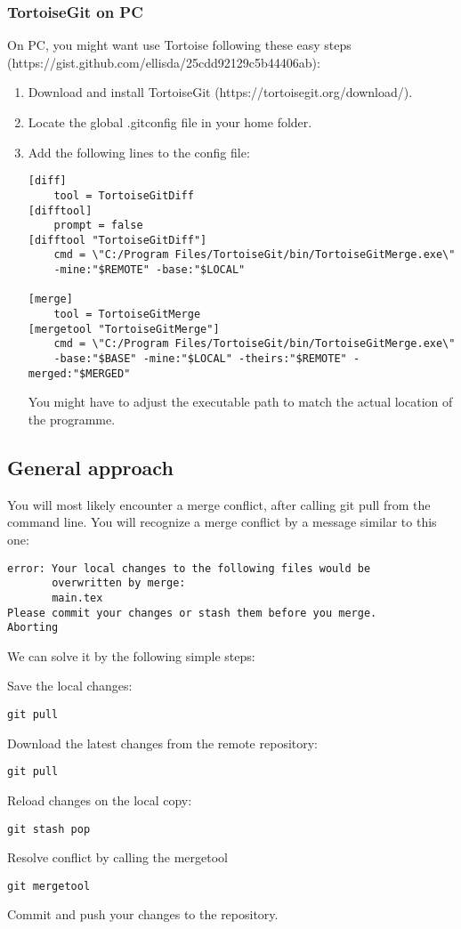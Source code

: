 \documentclass{article}
\begin{document}
\subsubsection{TortoiseGit on PC}
On PC, you might want use Tortoise following these easy steps (https://gist.github.com/ellisda/25cdd92129c5b44406ab):
\begin{enumerate}
    \item Download and install TortoiseGit (https://tortoisegit.org/download/).
    \item Locate the global .gitconfig file in your home folder.
    \item Add the following lines to the config file:
    \begin{verbatim}
[diff]
    tool = TortoiseGitDiff	
[difftool]
    prompt = false
[difftool "TortoiseGitDiff"]
    cmd = \"C:/Program Files/TortoiseGit/bin/TortoiseGitMerge.exe\"
    -mine:"$REMOTE" -base:"$LOCAL" 

[merge]
    tool = TortoiseGitMerge	
[mergetool "TortoiseGitMerge"]
    cmd = \"C:/Program Files/TortoiseGit/bin/TortoiseGitMerge.exe\"
    -base:"$BASE" -mine:"$LOCAL" -theirs:"$REMOTE" -merged:"$MERGED"
    \end{verbatim}
    You might have to adjust the executable path to match the actual location of the programme.
\end{enumerate}

\subsection{General approach}
You will most likely encounter a merge conflict, after calling git pull from the command line. You will recognize a merge conflict by a message similar to this one:
\begin{verbatim}
error: Your local changes to the following files would be 
       overwritten by merge:
       main.tex
Please commit your changes or stash them before you merge. 
Aborting
\end{verbatim}
We can solve it by the following simple steps:
\begin{enuemrate}
    \item Save the local changes:
    \begin{verbatim}
git pull
    \end{verbatim}
    \item  Download the latest changes from the remote repository:
    \begin{verbatim}
git pull
    \end{verbatim}
    \item Reload changes on the local copy:
    \begin{verbatim}
git stash pop
    \end{verbatim}
    \item Resolve conflict by calling the mergetool
    \begin{verbatim}
git mergetool
    \end{verbatim}
    \item Commit and push your changes to the repository.
\end{enuemrate}
\end{document}
